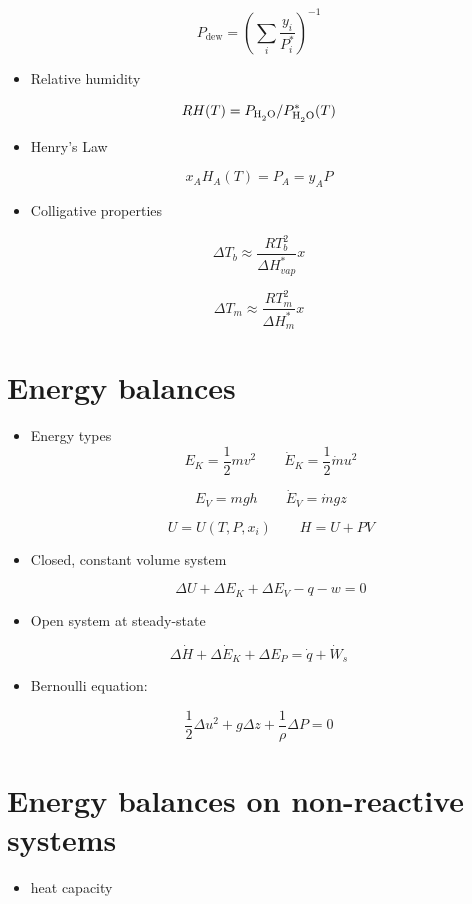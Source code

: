 \documentclass[11pt]{article}
\begin{document}
\[ P_{\text{dew}} = \left ( \sum_{i}\frac{y_{i}}{P_{i}^{*}} \right )^{-1} \]

\begin{itemize}
\item Relative humidity
\end{itemize}

\[ RH(T) = P_{\ce{H2O}}/P^{*}_{\ce{H2O}}(T) \]

\begin{itemize}
\item Henry's Law
\end{itemize}

\[ x_{A} H_{A}(T) = P_{A} = y_{A} P \]

\begin{itemize}
\item Colligative properties
\end{itemize}
\[\Delta T_{b} \approx \frac{R T_{b}^{2}}{\Delta H^{*}_{vap}}x \]

\[\Delta T_{m} \approx \frac{R T_{m}^{2}}{\Delta H^{*}_{m}}x \]

\section{Energy balances}
\label{sec-6}
\begin{itemize}
\item Energy types
\[ E_{K} = \frac{1}{2} m v^{2}\quad\quad \dot{E}_{K} = \frac{1}{2}\dot{m} u^{2} \]

\[ E_{V} = m g h \quad\quad \dot{E}_{V} = \dot{m} g z \]

\[ U = U(T,P,x_{i})\quad\quad H=U+PV\]

\item Closed, constant volume system

\[ \Delta U + \Delta E_{K} + \Delta E_{V} - q - w = 0 \]

\item Open system at steady-state
\end{itemize}

\[ \Delta\dot{H} + \Delta\dot{E}_{K} + \Delta{E}_{P} = \dot{q} + \dot{W}_{s} \]

\begin{itemize}
\item Bernoulli equation:
\end{itemize}

\[ \frac{1}{2} \Delta u^{2} + g\Delta z  + \frac{1}{\rho}\Delta P = 0\]

\section{Energy balances on non-reactive systems}
\label{sec-7}
\begin{itemize}
\item heat capacity
\end{itemize}
\end{document}
